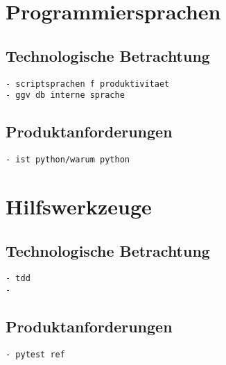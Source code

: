 \section{Programmiersprachen}
\subsection{Technologische Betrachtung}

\begin{verbatim}
- scriptsprachen f produktivitaet
- ggv db interne sprache
\end{verbatim}

\subsection{Produktanforderungen}

\begin{verbatim}
- ist python/warum python
\end{verbatim}


\section{Hilfswerkzeuge}
\subsection{Technologische Betrachtung}
\begin{verbatim}
- tdd
- 
\end{verbatim}
\subsection{Produktanforderungen}
\begin{verbatim}
- pytest ref
\end{verbatim}
